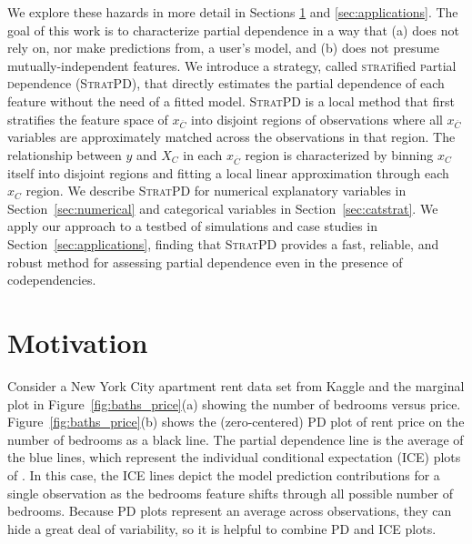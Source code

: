 \documentclass[12pt]{article}
\newcommand{\secref}[1]{Section~\ref{#1}}
\newcommand{\figref}[1]{Figure~\ref{#1}}
\newcommand{\spd}{\fontfamily{cmr}\textsc{\small StratPD}}
\newcommand{\xnC}{$x_{\overline{C}}$}
\begin{document}
We explore these hazards in more detail in Sections \ref{sec:motivation} and \ref{sec:applications}. The goal of this work is to characterize partial dependence in a way that (a) does not rely on, nor make predictions from, a user's model, and (b) does not presume mutually-independent features. We introduce a strategy, called {\textsc{strat}ified \textsc{p}artial \textsc{d}ependence} (\spd{}), that directly estimates the partial dependence of each feature without the need of a fitted model. \spd{} is a local method that first stratifies the feature space of \xnC{} into disjoint regions of observations where all \xnC{} variables are approximately matched across the observations in that region. The relationship between $y$ and $X_C$ in each \xnC{} region is characterized by binning ${x}_C$ itself into disjoint regions and fitting a local linear approximation through each ${x}_C$ region. We describe \spd{} for numerical explanatory variables in \secref{sec:numerical} and categorical variables in \secref{sec:catstrat}. We apply our approach to a testbed of simulations and case studies in \secref{sec:applications}, finding that \spd{} provides a fast, reliable, and robust method for assessing partial dependence even in the presence of codependencies. 

\section{Motivation}\label{sec:motivation}

Consider a New York City apartment rent data set from Kaggle \cite{rent} and the marginal plot in \figref{fig:baths_price}(a) showing the number of bedrooms versus price. \figref{fig:baths_price}(b) shows the (zero-centered) PD plot of rent price on the number of bedrooms as a black line. The partial dependence line is the average of the blue lines, which represent the individual conditional expectation (ICE) plots of \cite{ICE}. In this case, the ICE lines depict the model prediction contributions for a single observation as the bedrooms feature shifts through all possible number of bedrooms. Because PD plots represent an average across observations, they can hide a great deal of variability, so it is helpful to combine PD and ICE plots.
\end{document}
